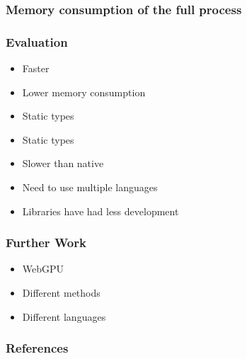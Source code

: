 \documentclass{beamer}
\begin{document}
\begin{frame}
    \frametitle{Memory consumption of the full process}
    \begin{figure}[H]
        \centering
    \end{figure}
\end{frame}




\begin{frame}
    \frametitle{Evaluation}
    \begin{itemize}
        \item[\Checkmark] Faster
        \item[\Checkmark] Lower memory consumption
        \item[\Checkmark] Static types
        \item[\XSolidBrush] Static types
        \item[\XSolidBrush] Slower than native
        \item[\XSolidBrush] Need to use multiple languages
        \item[\XSolidBrush] Libraries have had less development
    \end{itemize}
\end{frame}

\begin{frame}
    \frametitle{Further Work}
    \begin{itemize}
        \item WebGPU \cite{webgpu}
        \item Different methods
        \item Different languages
    \end{itemize}
\end{frame}

\begin{frame}[allowframebreaks]
    \frametitle{References}
    \printbibliography
\end{frame}
\end{document}

